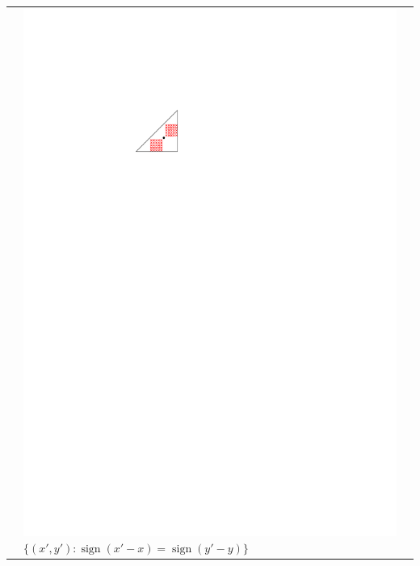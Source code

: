 \documentclass{patmorin}
\DeclareMathOperator{\sign}{sign}
\begin{document}
\begin{table}
\begin{center}
\begin{tabular}{m{1ex}|>{\centering\arraybackslash}m{}|>{\centering\arraybackslash}m{}}
         &  \includegraphics[scale=.9]{figs/killersb-5} \break%
            $\{(x',y'):\sign(x'-x)=\sign(y'-y)\}$ \\

\end{tabular}
\end{center}
\end{table}
\end{document}

